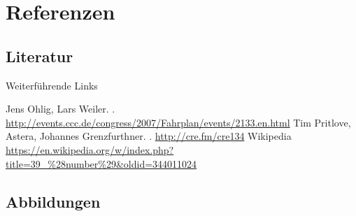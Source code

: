 \documentclass[hyperref={pdfpagelabels=false}]{beamer}
\begin{document}
\appendix

\section{Referenzen}

\subsection{Literatur}

\begin{frame}{Weiterführende Links}
    \begin{thebibliography}{XX}
        \beamertemplatetextbibitems
            Jens Ohlig, Lars Weiler.
            .
            \footnotesize
            \newblock \url{http://events.ccc.de/congress/2007/Fahrplan/events/2133.en.html}
            \normalsize
            Tim Pritlove, Astera, Johannes Grenzfurthner.
            .
            \newblock \url{http://cre.fm/cre134}
            Wikipedia
            \scriptsize
            \newblock \url{https://en.wikipedia.org/w/index.php?title=39\_\%28number\%29\&oldid=344011024}
            \normalsize
    \end{thebibliography}
\end{frame}

\subsection{Abbildungen}
\end{document}
